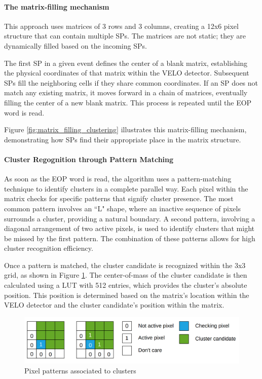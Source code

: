 \paragraph{The matrix-filling mechanism}
This approach uses matrices of 3 rows and 3 columns, creating a 12x6 pixel structure that can contain multiple SPs. The matrices are not static; they are dynamically filled based on the incoming SPs.

The first SP in a given event defines the center of a blank matrix, establishing the physical coordinates of that matrix within the VELO detector. Subsequent SPs fill the neighboring cells if they share common coordinates. If an SP does not match any existing matrix, it moves forward in a chain of matrices, eventually filling the center of a new blank matrix. This process is repeated until the EOP word is read.

Figure \ref{fig:matrix_filling_clustering} illustrates this matrix-filling mechanism, demonstrating how SPs find their appropriate place in the matrix structure.

\paragraph{Cluster Regognition through Pattern Matching}
As soon as the EOP word is read, the algorithm uses a pattern-matching technique to identify clusters in a complete parallel way. Each pixel within the matrix checks for specific patterns that signify cluster presence. The most common pattern involves an ``L" shape, where an inactive sequence of pixels surrounds a cluster, providing a natural boundary. A second pattern, involving a diagonal arrangement of two active pixels, is used to identify clusters that might be missed by the first pattern. The combination of these patterns allows for high cluster recognition efficiency.

Once a pattern is matched, the cluster candidate is recognized within the 3x3 grid, as shown in Figure \ref{fig:cluster_recognition}. The center-of-mass of the cluster candidate is then calculated using a LUT with 512 entries, which provides the cluster's absolute position. This position is determined based on the matrix's location within the VELO detector and the cluster candidate's position within the matrix.

\begin{figure}[h]
    \centering
    \includegraphics[width=\textwidth]{figures/cluster_recognition.png}
    \caption{Pixel patterns associated to clusters}
    \label{fig:cluster_recognition}
\end{figure}


